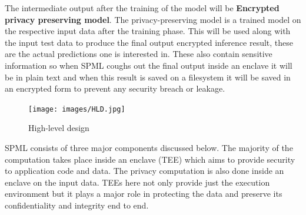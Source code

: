  The intermediate output after the training of the model will be \textbf{Encrypted privacy preserving model}. The privacy-preserving model is a trained model on the respective input data after the training phase. This will be used along with the input test data to produce the final output encrypted inference result, these are the actual predictions one is interested in. These also contain sensitive information so when SPML coughs out the final output inside an enclave it will be in plain text and when this result is saved on a filesystem it will be saved in an encrypted form to prevent any security breach or leakage.
\begin{figure}
    \centering
    \texttt{[image: images/HLD.jpg]}
    \caption{ High-level design}
    \label{default}
\end{figure}
SPML consists of three major components discussed below. The majority of the computation takes place inside an enclave (TEE) which aims to provide security to application code and data. The privacy computation is also done inside an enclave on the input data. TEEs here not only provide just the execution environment but it plays a major role in protecting the data and preserve its confidentiality and integrity end to end.
